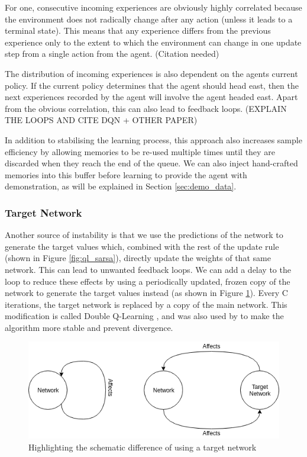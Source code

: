 For one, consecutive incoming experiences are obviously highly correlated because the environment does not radically change after any action (unless it leads to a terminal state). This means that any experience differs from the previous experience only to the extent to which the environment can change in one update step from a single action from the agent. (Citation needed)

The distribution of incoming experiences is also dependent on the agents current policy. If the current policy determines that the agent should head east, then the next experiences recorded by the agent will involve the agent headed east. Apart from the obvious correlation, this can also lead to feedback loops. (EXPLAIN THE LOOPS AND CITE DQN + OTHER PAPER)



In addition to stabilising the learning process, this approach also increases sample efficiency by allowing memories to be re-used multiple times until they are discarded when they reach the end of the queue. We can also inject hand-crafted memories into this buffer before learning to provide the agent with demonstration, as will be explained in Section \ref{sec:demo_data}.


\subsubsection{Target Network}\label{sec:target_network}
Another source of instability is that we use the predictions of the network to generate the target values which, combined with the rest of the update rule (shown in Figure \ref{fig:ql_sarsa}), directly update the weights of that same network. This can lead to unwanted feedback loops. We can add a delay to the loop to reduce these effects by using a periodically updated, frozen copy of the network to generate the target values instead (as shown in Figure \ref{fig:targetnet}). Every C iterations, the target network is replaced by a copy of the main network. This modification is called Double Q-Learning \citep{hasselt2010double}, and was also used by \citep{mnih2015human} to make the algorithm more stable and prevent divergence.

\begin{figure}[h]
    \centering
    \includegraphics[width=1\linewidth]{img/Target_Network.png}
    \caption{Highlighting the schematic difference of using a target network}
    \label{fig:targetnet}
\end{figure}


